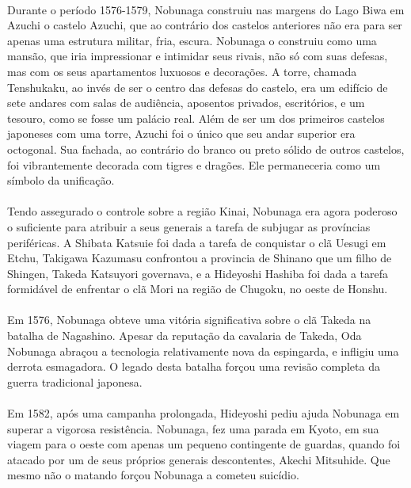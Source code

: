 \documentclass[12pt, a4paper]{article}
\begin{document}
            \\
            \indent Durante o período 1576-1579, Nobunaga construiu nas margens do Lago Biwa em Azuchi o castelo Azuchi, que ao contrário dos castelos anteriores não era para ser apenas uma estrutura militar, fria, escura. Nobunaga o construiu como uma mansão, que iria impressionar e intimidar seus rivais, não só com suas defesas, mas com os seus apartamentos luxuosos e decorações. A torre, chamada Tenshukaku, ao invés de ser o centro das defesas do castelo, era um edifício de sete andares com salas de audiência, aposentos privados, escritórios, e um tesouro, como se fosse um palácio real. Além de ser um dos primeiros castelos japoneses com uma torre, Azuchi foi o único que seu andar superior era octogonal. Sua fachada, ao contrário do branco ou preto sólido de outros castelos, foi vibrantemente decorada com tigres e dragões. Ele permaneceria como um símbolo da unificação.\\
            \\
            \indent Tendo assegurado o controle sobre a região Kinai, Nobunaga era agora poderoso o suficiente para atribuir a seus generais a tarefa de subjugar as províncias periféricas. A Shibata Katsuie foi dada a tarefa de conquistar o clã Uesugi em Etchu, Takigawa Kazumasu confrontou a provincia de  Shinano que um filho de Shingen, Takeda Katsuyori governava, e a Hideyoshi Hashiba foi dada a tarefa formidável de enfrentar o clã Mori na região de Chugoku, no oeste de Honshu.\\
            \\
            \indent Em 1576, Nobunaga obteve uma vitória significativa sobre o clã Takeda na batalha de Nagashino. Apesar da reputação da cavalaria de Takeda, Oda Nobunaga abraçou a tecnologia relativamente nova da espingarda, e infligiu uma derrota esmagadora. O legado desta batalha forçou uma revisão completa da guerra tradicional japonesa.\\
            \\
            \indent Em 1582, após uma campanha prolongada, Hideyoshi pediu ajuda Nobunaga em superar a vigorosa resistência. Nobunaga, fez uma parada em Kyoto, em sua viagem para o oeste com apenas um pequeno contingente de guardas, quando foi atacado por um de seus próprios generais descontentes, Akechi Mitsuhide. Que mesmo não o matando forçou Nobunaga a cometeu suicídio.\\
            
\end{document}
